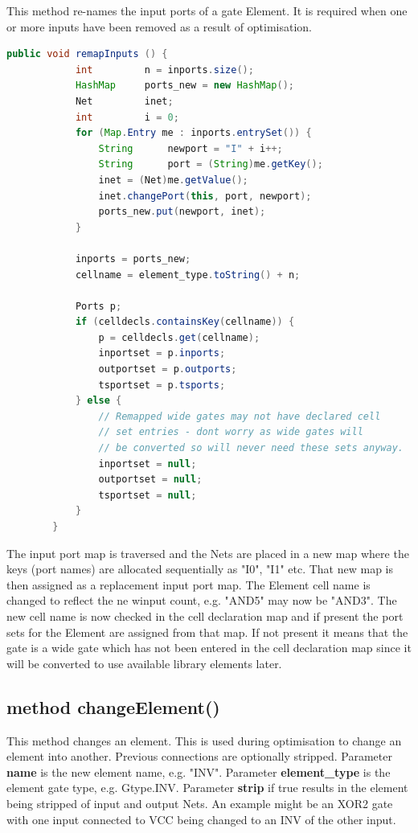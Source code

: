     This method re-names the input ports of a gate Element. It is
    required when one or more inputs have been removed as a result
    of optimisation.
    \begin{lstlisting}[gobble=4, language=java]
        public void remapInputs () {
            int         n = inports.size();
            HashMap     ports_new = new HashMap();
            Net         inet;
            int         i = 0;
            for (Map.Entry me : inports.entrySet()) {
                String      newport = "I" + i++;
                String      port = (String)me.getKey();
                inet = (Net)me.getValue();
                inet.changePort(this, port, newport);
                ports_new.put(newport, inet);
            }

            inports = ports_new;
            cellname = element_type.toString() + n;

            Ports p;
            if (celldecls.containsKey(cellname)) {
                p = celldecls.get(cellname);
                inportset = p.inports;
                outportset = p.outports;
                tsportset = p.tsports;
            } else {
                // Remapped wide gates may not have declared cell
                // set entries - dont worry as wide gates will
                // be converted so will never need these sets anyway.
                inportset = null;
                outportset = null;
                tsportset = null;
            }
        }
    \end{lstlisting}
    The input port map is traversed and the Nets are placed in a new map
    where the keys (port names) are allocated sequentially as "I0",
    "I1" etc. That new map is then assigned as a replacement input port
    map. The Element cell name is changed to reflect the ne winput count,
    e.g. "AND5" may now be "AND3". The new cell name is now checked
    in the cell declaration map and if present the port sets for the
    Element are assigned from that map. If not present it means that
    the gate is a wide gate which has not been entered in
    the cell declaration map since it will be converted to use available
    library elements later.

\subsection{method changeElement()}

    This method changes an element. This is used during optimisation to
    change an element into another. Previous connections are optionally
    stripped. Parameter {\bf name} is the new element name, e.g. "INV".
    Parameter {\bf element\_type} is the element gate type, e.g.
    Gtype.INV. Parameter {\bf strip} if true results in the element being
    stripped of input and output Nets. An example might be an XOR2 gate
    with one input connected to VCC being changed to an INV of the
    other input.

